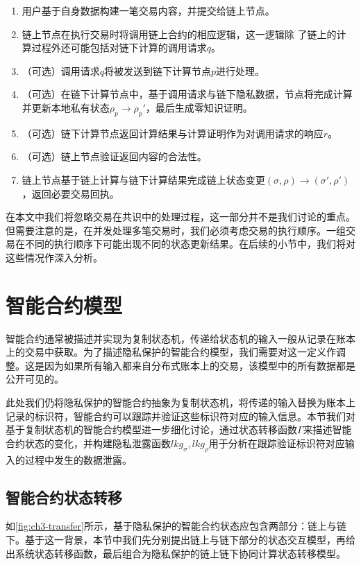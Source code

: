 \begin{enumerate}
    \setlength{\itemsep}{0pt}
    \setlength{\parsep}{0pt}
    \setlength{\parskip}{0pt}
\item 用户基于自身数据构建一笔交易内容，并提交给链上节点。
\item 链上节点在执行交易时将调用链上合约的相应逻辑，这一逻辑除 了链上的计算过程外还可能包括对链下计算的调用请求$\mathit{q}$。
\item （可选）调用请求$\mathit{q}$将被发送到链下计算节点$\mathit{p}$进行处理。
\item （可选）在链下计算节点中，基于调用请求与链下隐私数据，节点将完成计算并更新本地私有状态$\rho_\mathit{p}\rightarrow\rho_\mathit{p}'$，最后生成零知识证明。
\item （可选）链下计算节点返回计算结果与计算证明作为对调用请求的响应$\mathit{r}$。
\item （可选）链上节点验证返回内容的合法性。
\item 链上节点基于链上计算与链下计算结果完成链上状态变更$(\sigma, \rho)\rightarrow(\sigma', \rho')$，返回必要交易回执。
\end{enumerate}

在本文中我们将忽略交易在共识中的处理过程，这一部分并不是我们讨论的重点。但需要注意的是，在并发处理多笔交易时，我们必须考虑交易的执行顺序。一组交易在不同的执行顺序下可能出现不同的状态更新结果。在后续的小节中，我们将对这些情况作深入分析。
\section{智能合约模型}
智能合约通常被描述并实现为复制状态机，传递给状态机的输入一般从记录在账本上的交易中获取。为了描述隐私保护的智能合约模型，我们需要对这一定义作调整。这是因为如果所有输入都来自分布式账本上的交易，该模型中的所有数据都是公开可见的。

此处我们仍将隐私保护的智能合约抽象为复制状态机，将传递的输入替换为账本上记录的标识符，智能合约可以跟踪并验证这些标识符对应的输入信息。本节我们对基于复制状态机的智能合约模型进一步细化讨论，通过状态转移函数$\Gamma$来描述智能合约状态的变化，并构建隐私泄露函数$lkg_\sigma, lkg_\rho$用于分析在跟踪验证标识符对应输入的过程中发生的数据泄露。
\subsection{智能合约状态转移}
如\autoref{fig:ch3-transfer}所示，基于隐私保护的智能合约状态应包含两部分：链上与链下。基于这一背景，本节中我们先分别提出链上与链下部分的状态交互模型，再给出系统状态转移函数，最后组合为隐私保护的链上链下协同计算状态转移模型。


